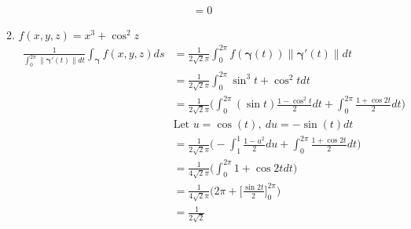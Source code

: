 \documentclass{article}
\newcommand{\norm}[1]{\| #1 \|}
\begin{document}
\begin{enumerate}
\begin{enumerate}
\begin{align*}
        &= 0
    \end{align*}
    \item $f(x,y,z) = x^3 + \cos^2 z$
    \begin{align*} 
        \frac{1}{\int_0^{2\pi} \norm{\boldsymbol{\gamma}'(t)}dt}  \int_{\boldsymbol{\gamma}}f(x,y,z)ds &= \frac{1}{2\sqrt{2}\pi} \int_0^{2\pi} f(\boldsymbol{\gamma}(t)) \norm{\boldsymbol{\gamma}'(t)}dt \\
        &= \frac{1}{2\sqrt{2}\pi} \int_0^{2\pi} \sin^3t + \cos^2t dt  \\
        &= \frac{1}{2\sqrt{2}\pi} \Big( \int_0^{2\pi} (\sin t)\frac{1 - \cos^2t}{2} dt + \int_0^{2\pi} \frac{1+\cos 2t}{2} dt  \Big) \\
        &\text{Let } u = \cos(t),\: du = -\sin(t)dt \\
        &= \frac{1}{2\sqrt{2}\pi} \Big( -\int_1^{1} \frac{1 - u^2}{2} du + \int_0^{2\pi} \frac{1+\cos 2t}{2} dt  \Big) \\
        &= \frac{1}{4\sqrt{2}\pi} \Big( \int_0^{2\pi} 1+\cos 2t dt  \Big) \\
        &= \frac{1}{4\sqrt{2}\pi} \Big( 2 \pi + \Big[\frac{\sin 2t}{2} \Big]_0^{2\pi} \Big) \\
        &= \frac{1}{2\sqrt{2}} \\
    \end{align*}
\end{enumerate}
\end{enumerate}
\end{document}
